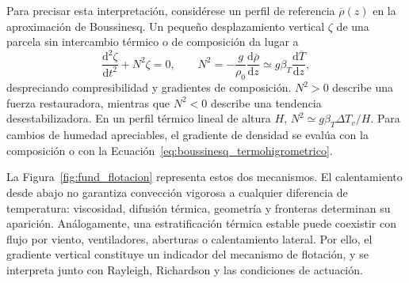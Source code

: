 Para precisar esta interpretación, considérese un perfil de referencia $\overline\rho(z)$ en la aproximación de Boussinesq. Un pequeño desplazamiento vertical $\zeta$ de una parcela sin intercambio térmico o de composición da lugar a
\begin{equation}
\frac{\mathrm d^2\zeta}{\mathrm dt^2}+N^2\zeta=0,
\qquad
N^2=-\frac{g}{\rho_0}\frac{\mathrm d\overline\rho}{\mathrm dz}
\simeq g\beta_T\frac{\mathrm d\overline T}{\mathrm dz},
\label{eq:fund_estabilidad_vertical}
\end{equation}
despreciando compresibilidad y gradientes de composición. $N^2>0$ describe una fuerza restauradora, mientras que $N^2<0$ describe una tendencia desestabilizadora. En un perfil térmico lineal de altura $H$, $N^2\simeq g\beta_T\Delta T_v/H$. Para cambios de humedad apreciables, el gradiente de densidad se evalúa con la composición o con la Ecuación~\eqref{eq:boussinesq_termohigrometrico}.

La Figura~\ref{fig:fund_flotacion} representa estos dos mecanismos. El calentamiento desde abajo no garantiza convección vigorosa a cualquier diferencia de temperatura: viscosidad, difusión térmica, geometría y fronteras determinan su aparición. Análogamente, una estratificación térmica estable puede coexistir con flujo por viento, ventiladores, aberturas o calentamiento lateral. Por ello, el gradiente vertical constituye un indicador del mecanismo de flotación, y se interpreta junto con Rayleigh, Richardson y las condiciones de actuación.
